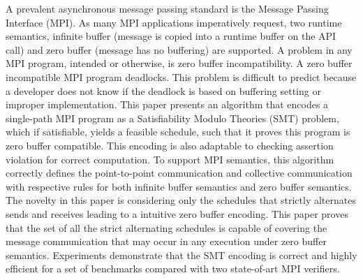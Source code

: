 %
A prevalent asynchronous message passing standard is the Message Passing Interface (MPI). 
%
As many MPI applications imperatively request, two runtime semantics, infinite buffer (message is copied into a runtime buffer on the API call) and zero buffer (message has no buffering) are supported.
%
A problem in any MPI program, intended or otherwise, is zero buffer incompatibility. A zero buffer incompatible MPI program deadlocks.
%
This problem is difficult to predict because a developer does not know if the deadlock is based on buffering setting or improper implementation. 
%
This paper presents an algorithm that encodes a single-path MPI program as a Satisfiability Modulo Theories (SMT) problem, which if satisfiable, yields a feasible schedule, such that it proves this program is zero buffer compatible. This encoding is also adaptable to checking assertion violation for correct computation.
%
To support MPI semantics, this algorithm correctly defines the point-to-point communication and collective communication with respective rules for both infinite buffer semantics and zero buffer semantics. 
%
The novelty in this paper is considering only the schedules that strictly alternates sends and receives leading to a intuitive zero buffer encoding.
%
This paper proves that the set of all the strict alternating schedules is capable of covering the message communication that may occur in any execution under zero buffer semantics. 
%
%
%
%
%
%
%
%
Experiments demonstrate that the SMT encoding is correct and highly efficient for a set of benchmarks compared with two state-of-art MPI verifiers. 
%
